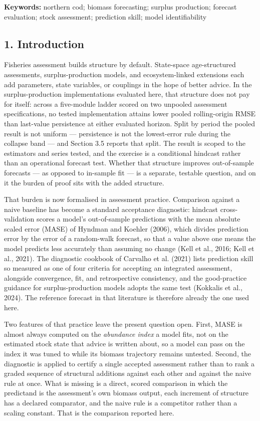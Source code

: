 \documentclass[11pt]{article}
\begin{document}
\textbf{Keywords:} northern cod; biomass forecasting; surplus
production; forecast evaluation; stock assessment; prediction skill;
model identifiability

\subsection{1. Introduction}\label{cod-introduction}

Fisheries assessment builds structure by default. State-space
age-structured assessments, surplus-production models, and
ecosystem-linked extensions each add parameters, state variables, or
couplings in the hope of better advice. In the surplus-production implementations evaluated here, that structure
does not pay for itself: across a five-module ladder scored on two
unpooled assessment specifications, no tested implementation attains
lower pooled rolling-origin RMSE than last-value persistence at either
evaluated horizon. Split by period the pooled result is not uniform ---
persistence is not the lowest-error rule during the collapse band ---
and Section 3.5 reports that split. The result is scoped to the estimators and
series tested, and the exercise is a conditional hindcast rather than
an operational forecast test. Whether that structure improves
out-of-sample forecasts --- as opposed to in-sample fit --- is a
separate, testable question, and on it the burden of proof sits with the
added structure.

That burden is now formalised in assessment practice. Comparison against
a naive baseline has become a standard acceptance diagnostic: hindcast
cross-validation scores a model's out-of-sample predictions with the
mean absolute scaled error (MASE) of Hyndman and Koehler (2006), which
divides prediction error by the error of a random-walk forecast, so that
a value above one means the model predicts less accurately than assuming
no change (Kell et al., 2016; Kell et al., 2021). The diagnostic
cookbook of Carvalho et al. (2021) lists prediction skill so measured as
one of four criteria for accepting an integrated assessment, alongside
convergence, fit, and retrospective consistency, and the good-practice
guidance for surplus-production models adopts the same test (Kokkalis
et al., 2024). The reference forecast in that literature is therefore
already the one used here.

Two features of that practice leave the present question open. First,
MASE is almost always computed on the \emph{abundance index} a model
fits, not on the estimated stock state that advice is written about, so
a model can pass on the index it was tuned to while its biomass
trajectory remains untested. Second, the diagnostic is applied to
certify a single accepted assessment rather than to rank a graded
sequence of structural additions against each other and against the
naive rule at once. What is missing is a direct, scored comparison in
which the predictand is the assessment's own biomass output, each
increment of structure has a declared comparator, and the naive rule is
a competitor rather than a scaling constant. That is the comparison
reported here.
\end{document}
